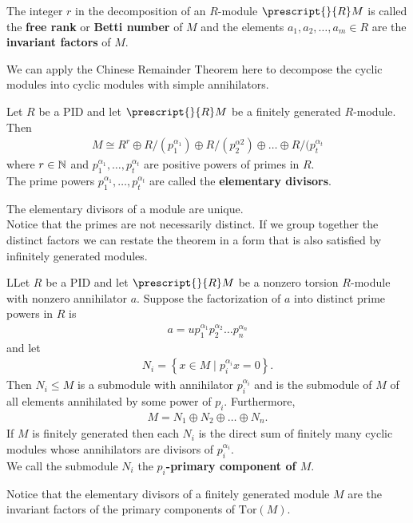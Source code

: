 \documentclass{memoir}
\begin{document}
\begin{defn}
	The integer \(r\) in the decomposition of an \(R\)-module \(\prescript{}{R}M\) is called the \textbf{free rank} or \textbf{Betti number} of \(M\) and the elements \(a_1,a_2,\ldots,a_m \in R\) are the \textbf{invariant factors} of \(M\).
\end{defn}

We can apply the Chinese Remainder Theorem here to decompose the cyclic modules into cyclic modules with simple annihilators.

\begin{thm}
	Let \(R\) be a PID and let \(\prescript{}{R}M\) be a finitely generated \(R\)-module. Then
	\begin{align*}
		M \cong R^{r} \oplus R / (p_1^{\alpha _1}) \oplus R / (p_2^{\alpha 2}) \oplus \ldots \oplus R / (p_t ^{\alpha _t}
	\end{align*}
	where \(r \in \mathbb{N}\) and \(p_1^{\alpha_1},\ldots,p_t ^{\alpha _t}\) are positive powers of primes in \(R\).\\

	The prime powers \(p_1^{\alpha _1},\ldots,p_t ^{\alpha _t}\) are called the \textbf{elementary divisors}.
\end{thm}
The elementary divisors of a module are unique.\\

Notice that the primes are not necessarily distinct. If we group together the distinct factors we can restate the theorem in a form that is also satisfied by infinitely generated modules.

\begin{thm}
	LLet \(R\) be a PID and let \(\prescript{}{R}M\) be a nonzero torsion \(R\)-module with nonzero annihilator \(a\). Suppose the factorization of \(a\) into distinct prime powers in \(R\) is
	\begin{align*}
		a = u p_1^{\alpha _1}p_2^{\alpha_2}\ldots p_n^{\alpha _n}
	\end{align*}
	and let
	\begin{align*}
		N_i = \left\{x \in M \mid p_i^{\alpha _i}x = 0 \right\} .
	\end{align*}
	Then \(N_i\leq M\) is a submodule with annihilator \(p_i^{\alpha _i}\) and is the submodule of \(M\) of all elements annihilated by some power of \(p_i\). Furthermore,
	\begin{align*}
		M = N_1 \oplus N_2 \oplus \ldots \oplus N_n.
	\end{align*}
	If \(M\) is finitely generated then each \(N_i\) is the direct sum of finitely many cyclic modules whose annihilators are divisors of \(p_i^{\alpha _i}\).\\

	We call the submodule \(N_i\) the \textbf{\(p_i\)-primary component of \(M\)}.
\end{thm}
Notice that the elementary divisors of a finitely generated module \(M\) are the invariant factors of the primary components of \(\textrm{Tor}(M)\).\\
\end{document}

